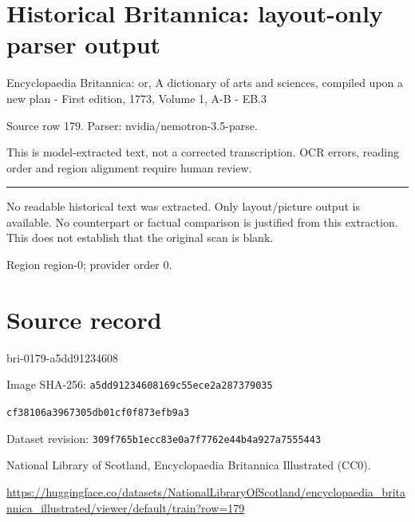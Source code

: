 \documentclass[11pt]{article}
\begin{document}
\section*{Historical Britannica: layout-only parser output}
Encyclopaedia Britannica: or, A dictionary of arts and sciences, compiled upon a new plan - First edition, 1773, Volume 1, A-B - EB.3\par
{\small Source row 179. Parser: nvidia/nemotron-3.5-parse.\par}
{\small This is model-extracted text, not a corrected transcription. OCR errors, reading order and region alignment require human review.\par}
\hrule\medskip
{\color{red} No readable historical text was extracted. Only layout/picture output is available. No counterpart or factual comparison is justified from this extraction. This does not establish that the original scan is blank.\par}


\par

{\scriptsize\color{gray} Region region-0; provider order 0.\par}
\medskip
\newpage\section*{Source record}
bri-0179-a5dd91234608\par
Image SHA-256: \texttt{a5dd91234608169c55ece2a287379035}\par\texttt{cf38106a3967305db01cf0f873efb9a3}\par
Dataset revision: \texttt{309f765b1ecc83e0a7f7}\texttt{762e44b4a927a7555443}\par
National Library of Scotland, Encyclopaedia Britannica Illustrated (CC0).\par
\url{https://huggingface.co/datasets/NationalLibraryOfScotland/encyclopaedia_britannica_illustrated/viewer/default/train?row=179}
\end{document}
